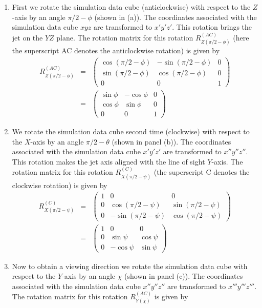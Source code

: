 \documentclass[useAMS, usenatbib]{mn2e}
\begin{document}
\begin{enumerate}
\item First we rotate the simulation data cube (anticlockwise) with respect to the $Z$-axis by an angle $\pi/2 - \phi$ (shown in (a)). The coordinates associated with the simulation data cube $xyz$ are transformed to $x'y'z'$. This rotation brings the jet on the $YZ$ plane. The rotation matrix for this rotation $R^{(AC)}_{Z(\pi/2 - \phi)}$ (here the superscript AC denotes the anticlockwise rotation) is given by 
\begin{eqnarray}
R^{(AC)}_{Z(\pi/2 - \phi)}  &=& \begin{pmatrix}
 \cos(\pi/2 - \phi) & -\sin(\pi/2 - \phi) & 0 \\
\sin(\pi/2 - \phi) & \cos(\pi/2 - \phi) & 0 \\
0 & 0 & 1
\end{pmatrix} \nonumber \\
&=& \begin{pmatrix}
 \sin\phi & -\cos\phi & 0 \\
\cos\phi & \sin\phi & 0 \\
0 & 0 & 1
\end{pmatrix} 
\end{eqnarray}
\item We rotate the simulation data cube second time (clockwise) with respect to the $X$-axis by an angle $\pi/2 - \theta$ (shown in panel (b)). The coordinates associated with the simulation data cube $x'y'z'$ are transformed to $x''y''z''$. This rotation makes the jet axis aligned with the line of sight $Y$-axis. The rotation matrix for this rotation $R^{(C)}_{X(\pi/2 - \psi)}$ (the superscript C denotes the clockwise rotation) is given by 
\begin{eqnarray}
R^{(C)}_{X(\pi/2 - \psi)} &=& \begin{pmatrix}
 1 & 0 & 0 \\
0 & \cos(\pi/2 - \psi) & \sin(\pi/2 - \psi) \\
0 & -\sin(\pi/2 - \psi) & \cos(\pi/2 - \psi)
\end{pmatrix} \nonumber \\
& = &\begin{pmatrix}
1 & 0 & 0 \\
0 & \sin\psi & \cos\psi \\
0 & -\cos\psi & \sin\psi
\end{pmatrix}  
\end{eqnarray}
\item Now to obtain a viewing direction we rotate the simulation data cube with respect to the $Y$-axis by an angle $\chi$ (shown in panel (c)). The coordinates associated with the simulation data cube $x''y''z''$ are transformed to $x'''y'''z'''$. The rotation matrix for this rotation $R^{(AC)}_{Y(\chi)} $ is given by

\end{enumerate}
\end{document}
